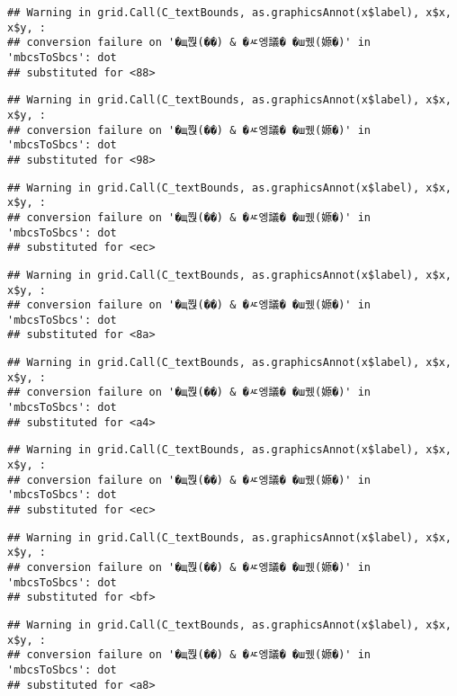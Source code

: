 \documentclass[
]{article}
\begin{document}
\begin{verbatim}
## Warning in grid.Call(C_textBounds, as.graphicsAnnot(x$label), x$x, x$y, :
## conversion failure on '�щ쭩(��) & �ㅼ엥議� �ш퀬(嫄�)' in 'mbcsToSbcs': dot
## substituted for <88>
\end{verbatim}

\begin{verbatim}
## Warning in grid.Call(C_textBounds, as.graphicsAnnot(x$label), x$x, x$y, :
## conversion failure on '�щ쭩(��) & �ㅼ엥議� �ш퀬(嫄�)' in 'mbcsToSbcs': dot
## substituted for <98>
\end{verbatim}

\begin{verbatim}
## Warning in grid.Call(C_textBounds, as.graphicsAnnot(x$label), x$x, x$y, :
## conversion failure on '�щ쭩(��) & �ㅼ엥議� �ш퀬(嫄�)' in 'mbcsToSbcs': dot
## substituted for <ec>
\end{verbatim}

\begin{verbatim}
## Warning in grid.Call(C_textBounds, as.graphicsAnnot(x$label), x$x, x$y, :
## conversion failure on '�щ쭩(��) & �ㅼ엥議� �ш퀬(嫄�)' in 'mbcsToSbcs': dot
## substituted for <8a>
\end{verbatim}

\begin{verbatim}
## Warning in grid.Call(C_textBounds, as.graphicsAnnot(x$label), x$x, x$y, :
## conversion failure on '�щ쭩(��) & �ㅼ엥議� �ш퀬(嫄�)' in 'mbcsToSbcs': dot
## substituted for <a4>
\end{verbatim}

\begin{verbatim}
## Warning in grid.Call(C_textBounds, as.graphicsAnnot(x$label), x$x, x$y, :
## conversion failure on '�щ쭩(��) & �ㅼ엥議� �ш퀬(嫄�)' in 'mbcsToSbcs': dot
## substituted for <ec>
\end{verbatim}

\begin{verbatim}
## Warning in grid.Call(C_textBounds, as.graphicsAnnot(x$label), x$x, x$y, :
## conversion failure on '�щ쭩(��) & �ㅼ엥議� �ш퀬(嫄�)' in 'mbcsToSbcs': dot
## substituted for <bf>
\end{verbatim}

\begin{verbatim}
## Warning in grid.Call(C_textBounds, as.graphicsAnnot(x$label), x$x, x$y, :
## conversion failure on '�щ쭩(��) & �ㅼ엥議� �ш퀬(嫄�)' in 'mbcsToSbcs': dot
## substituted for <a8>
\end{verbatim}
\end{document}
